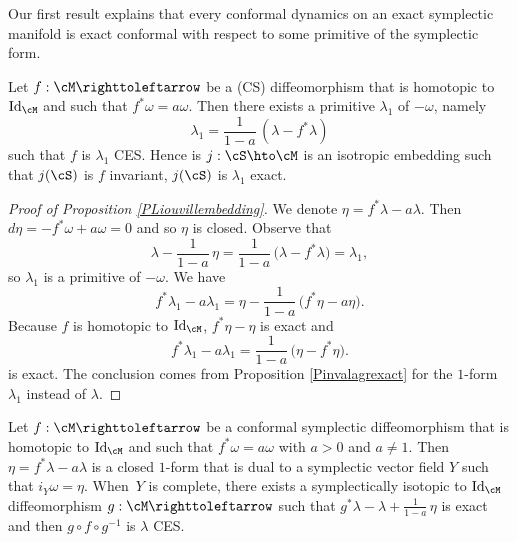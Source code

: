Our first result explains that every conformal dynamics on an exact symplectic manifold is exact conformal with respect to some primitive of the symplectic form.

\begin{proposition}\label{PLiouvillembedding}
Let $f: \cM \righttoleftarrow$ be a (CS) diffeomorphism that is homotopic to ${\rm Id}_{\cM}$ and such that $f^*\omega=a\omega$. Then there exists a primitive $\lambda_1$ of $-\omega$, namely\vspace*{-3pt}
\[
\lambda_1=\frac{1}{1-a}\,(\lambda-f^*\lambda)
\]
such that $f$ is $\lambda_1$ CES. Hence is $j:\cS\hto\cM$ is an isotropic embedding such that $j(\cS)$ is $f$ invariant, $j(\cS)$ is $\lambda_1$ exact.
\end{proposition}

\begin{proof}[Proof of Proposition \ref{PLiouvillembedding}]
We denote $\eta=f^*\lambda-a\lambda$. Then $d\eta=-f^*\omega+a\omega=0$ and so $\eta$ is closed. Observe that\vspace*{-3pt}
\[
\lambda-\frac{1}{1-a}\,\eta=\frac{1}{1-a}\,\big(\lambda-f^*\lambda)=\lambda_1,
\]
so $\lambda_1$ is a primitive of $-\omega$. We have\vspace*{-3pt}
\[
f^*\lambda_1-a\lambda_1=\eta-\frac{1}{1-a}\,\big(f^*\eta-a\eta\big).
\]
Because $f$ is homotopic to ${\rm Id}_\cM$, $f^*\eta-\eta$ is exact and\vspace*{-3pt}
\[
f^*\lambda_1-a\lambda_1=\frac{1}{1-a}\,\big( \eta-f^*\eta\big).
\]
is exact. The conclusion comes from Proposition \ref{Pinvalagrexact} for the $1$-form $\lambda_1$ instead of $\lambda$.
\end{proof}

\begin{proposition}\label{PCES}
Let $f: \cM \righttoleftarrow$ be a conformal symplectic diffeomorphism that is homotopic to ${\rm Id}_\cM$ and such that $f^*\omega=a\omega$ with $a>0$ and $a\not=1$. Then $\eta=f^*\lambda-a\lambda$ is a closed $1$-form that is dual to a symplectic vector field $Y$ such that $i_Y\omega=\eta.$ When~$Y$ is complete, there exists a symplectically isotopic to ${\rm Id}_\cM$ diffeomorphism $g: \cM \righttoleftarrow$ such that $g^*\lambda-\lambda +\frac{1}{1-a}\,\eta$ is exact and then $g\circ f\circ g^{-1}$ is $\lambda$ CES.
\end{proposition}

